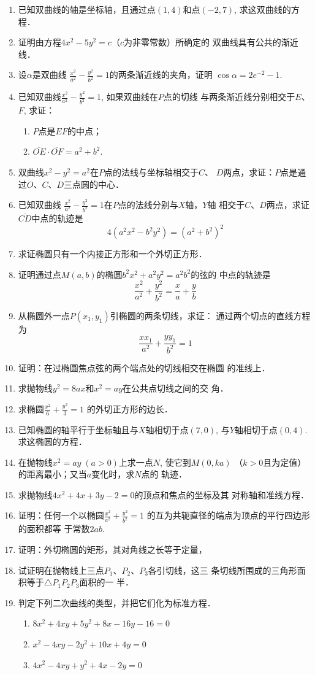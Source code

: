\begin{enumerate}
\item 已知双曲线的轴是坐标轴，且通过点$(1,4)$和点$(-2,
7)$, 求这双曲线的方程．
\item 证明由方程$4x^2-5y^2=c$（$c$为非零常数）所确定的
双曲线具有公共的渐近线．
\item 设$\alpha$是双曲线
$\frac{x^2}{a^2}-\frac{y^2}{b^2}=1$的两条渐近线的夹角，证明
$\cos\alpha=2e^{-2}-1$.
\item 已知双曲线$\frac{x^2}{a^2}-\frac{y^2}{b^2}=1$, 如果双曲线在$P$点的切线
与两条渐近线分别相交于$E$、$F$, 求证：
\begin{enumerate}
    \item $P$点是$EF$的中点；
    \item $\overline{OE}\cdot \overline{OF}=a^2+b^2$.
\end{enumerate}

\item 双曲线$x^2-y^2=a^2$在$P$点的法线与坐标轴相交于$C$、
$D$两点，求证：$P$点是通过$O$、$C$、$D$三点圆的中心．
\item 已知双曲线
$\frac{x^2}{a^2}-\frac{y^2}{b^2}=1$在$P$点的法线分别与$X$轴，$Y$轴
相交于$C$、$D$两点，求证$\overline{CD}$中点的轨迹是
\[4(a^2x^2-b^2y^2)=(a^2+b^2)^2\]
\item 求证椭圆只有一个内接正方形和一个外切正方形．
\item 证明通过点$M(a,b)$的椭圆$b^2x^2+a^2y^2=a^2b^2$的弦的
中点的轨迹是
\[\frac{x^2}{a^2}+\frac{y^2}{b^2}=\frac{x}{a}+\frac{y}{b}\]
\item 从椭圆外一点$P(x_1,y_1)$引椭圆的两条切线，求证：
通过两个切点的直线方程为
\[\frac{xx_1}{a^2}+\frac{yy_1}{b^2}=1\]

\item 证明：在过椭圆焦点弦的两个端点处的切线相交在椭圆
的准线上．
\item 求抛物线$y^2=8ax$和$x^2=ay$在公共点切线之间的交
角．
\item 求椭圆$\frac{x^2}{6}+\frac{y^2}{3}=1$
的外切正方形的边长．
\item 已知椭圆的轴平行于坐标轴且与$X$轴相切于点$(7,0)$, 
与$Y$轴相切于点$(0,4)$. 求这椭圆的方程．
\item 在抛物线$x^2=ay\; (a>0)$上求一点$N$, 使它到$M(0,ka)$
（$k>0$且为定值）的距离最小；又当$a$变化时，求$N$点的
轨迹．
\item 求抛物线$4x^2+4x+3y-2=0$的顶点和焦点的坐标及其
对称轴和准线方程．
\item 证明：任何一个以椭圆$\frac{x^2}{a^2}+\frac{y^2}{b^2}=1$
的互为共轭直径的端点为顶点的平行四边形的面积都等
于常数$2ab$. 
\item 证明：外切椭圆的矩形，其对角线之长等于定量，
\item 试证明在抛物线上三点$P_1$、$P_2$、$P_3$各引切线，这三
条切线所围成的三角形面积等于$\triangle P_1P_2P_3$面积的一
半．
\item 判定下列二次曲线的类型，并把它们化为标准方程．
\begin{enumerate}
    \item $8x^2+4xy+5y^2+8x-16y-16=0$
    \item $x^2-4xy-2y^2+10x+4y=0$
    \item $4x^2-4xy+y^2+4x-2y=0$
\end{enumerate}
\end{enumerate}


